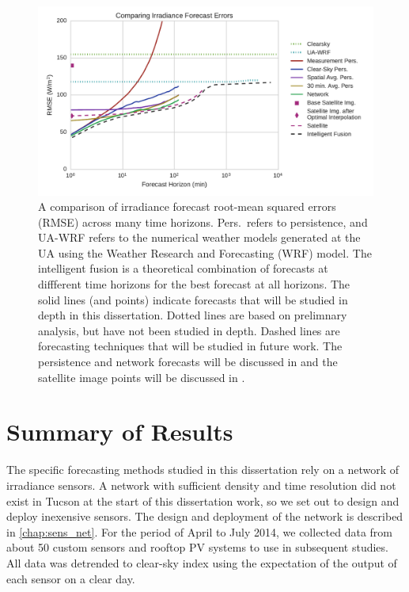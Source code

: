 \begin{figure}[htbp]
\includegraphics[width=\textwidth]{figs/timehorizon.pdf}
\caption[Irradiance forecast errors across forecast horizons]{A
  comparison of irradiance forecast root-mean squared errors (RMSE)
  across many time horizons.  Pers.\ refers to persistence, and UA-WRF
  refers to the numerical weather models generated at the UA using the
  Weather Research and Forecasting (WRF) model. The intelligent fusion
  is a theoretical combination of forecasts at diffferent time
  horizons for the best forecast at all horizons.  The solid lines
  (and points) indicate forecasts that will be studied in depth in
  this dissertation. Dotted lines are based on prelimnary analysis,
  but have not been studied in depth.  Dashed lines are forecasting
  techniques that will be studied in future work.  The persistence and
  network forecasts will be discussed in  and the
  satellite image points will be discussed in .}
\label{fig:newshitplot}
\end{figure}

\section{Summary of Results}

The specific forecasting methods studied in this dissertation rely on
a network of irradiance sensors.
A network with sufficient density and time resolution did not exist in
Tucson at the start of this dissertation work, so we set out to design
and deploy inexensive sensors.
The design and deployment of the network is described in
\cref{chap:sens_net}.
For the period of April to July 2014, we collected data from about 50
custom sensors and rooftop PV systems to use in subsequent studies.
All data was detrended to clear-sky index using the expectation of the
output of each sensor on a clear day.

